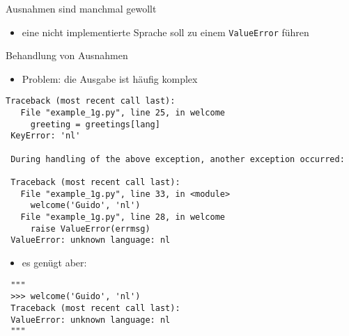 \documentclass[t, utf8x, 10pt]{beamer}
\begin{document}
\begin{frame}[fragile]{Ausnahmen sind manchmal gewollt}
 \begin{tiny}
  
 \end{tiny}

 \begin{itemize}
  \item eine nicht implementierte Sprache soll zu einem \texttt{ValueError} führen
 \end{itemize}
\end{frame}


\begin{frame}[fragile]{Behandlung von Ausnahmen}
 \begin{itemize}
  \item Problem: die Ausgabe ist häufig komplex
 \end{itemize}
 \begin{footnotesize}
  \begin{lstlisting}[language={}]
 Traceback (most recent call last):
   File "example_1g.py", line 25, in welcome
     greeting = greetings[lang]
 KeyError: 'nl'

 During handling of the above exception, another exception occurred:

 Traceback (most recent call last):
   File "example_1g.py", line 33, in <module>
     welcome('Guido', 'nl')
   File "example_1g.py", line 28, in welcome
     raise ValueError(errmsg)
 ValueError: unknown language: nl
  \end{lstlisting}
 \end{footnotesize}
 \begin{itemize}
  \item es genügt aber:
 \end{itemize}
 \begin{footnotesize}
  \begin{lstlisting}
 """
 >>> welcome('Guido', 'nl')
 Traceback (most recent call last):
 ValueError: unknown language: nl
 """
  \end{lstlisting}
 \end{footnotesize}

\end{frame}
\end{document}
